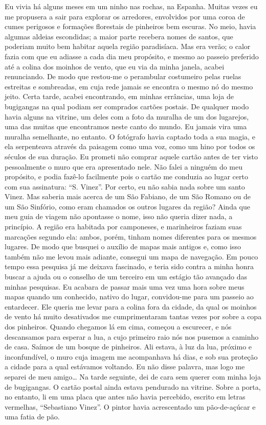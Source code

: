 Eu vivia há alguns meses em um ninho nas rochas, na Espanha. Muitas
vezes eu me propusera a sair para explorar os arredores, envolvidos por
uma coroa de cumes perigosos e formações florestais de pinheiros bem
escuras. No meio, havia algumas aldeias escondidas; a maior parte
recebera nomes de santos, que poderiam muito bem habitar aquela região
paradisíaca. Mas era verão; o calor fazia com que eu adiasse a cada dia
meu propósito, e mesmo ao passeio preferido até a colina dos moinhos de
vento, que eu via da minha janela, acabei renunciando. De modo que
restou-me o perambular costumeiro pelas ruelas estreitas e sombreadas,
em cuja rede jamais se encontra o mesmo nó do mesmo jeito. Certa tarde,
acabei encontrando, em minhas errâncias, uma loja de bugigangas na qual
podiam ser comprados cartões postais. De qualquer modo havia alguns na
vitrine, um deles com a foto da muralha de um dos lugarejos, uma das
muitas que encontramos neste canto do mundo. Eu jamais vira uma muralha
semelhante, no entanto. O fotógrafo havia captado toda a sua magia, e
ela serpenteava através da paisagem como uma voz, como um hino por todos
os séculos de sua duração. Eu prometi não comprar aquele cartão antes de
ter visto pessoalmente o muro que era apresentado nele. Não falei a
ninguém do meu propósito, e podia fazê-lo facilmente pois o cartão me
conduzia ao lugar certo com sua assinatura: ``S. Vinez''. Por certo, eu
não sabia nada sobre um santo Vinez. Mas saberia mais acerca de um São
Fabiano, de um São Romano ou de um São Sinfório, como eram chamados os
outros lugares da região? Ainda que meu guia de viagem não apontasse o
nome, isso não queria dizer nada, a princípio. A região era habitada por
camponeses, e marinheiros faziam suas marcações segundo ela: ambos,
porém, tinham nomes diferentes para os mesmos lugares. De modo que
busquei o auxílio de mapas mais antigos e, como isso também não me levou
mais adiante, consegui um mapa de navegação. Em pouco tempo essa
pesquisa já me deixava fascinado, e teria sido contra a minha honra
buscar a ajuda ou o conselho de um terceiro em um estágio tão avançado
das minhas pesquisas. Eu acabara de passar mais uma vez uma hora sobre
meus mapas quando um conhecido, nativo do lugar, convidou-me para um
passeio ao entardecer. Ele queria me levar para a colina fora da cidade,
da qual os moinhos de vento há muito desativados me cumprimentaram
tantas vezes por sobre a copa dos pinheiros. Quando chegamos lá em cima,
começou a escurecer, e nós descansamos para esperar a lua, a cujo
primeiro raio nós nos pusemos a caminho de casa. Saímos de um bosque de
pinheiros. Ali estava, à luz da lua, próximo e inconfundível, o muro
cuja imagem me acompanhava há dias, e sob sua proteção a cidade para a
qual estávamos voltando. Eu não disse palavra, mas logo me separei de
meu amigo\ldots{} Na tarde seguinte, dei de cara sem querer com minha loja de
bugigangas. O cartão postal ainda estava pendurado na vitrine. Sobre a
porta, no entanto, li em uma placa que antes não havia percebido,
escrito em letras vermelhas, ``Sebastiano Vinez''. O pintor havia
acrescentado um pão-de-açúcar e uma fatia de pão.


